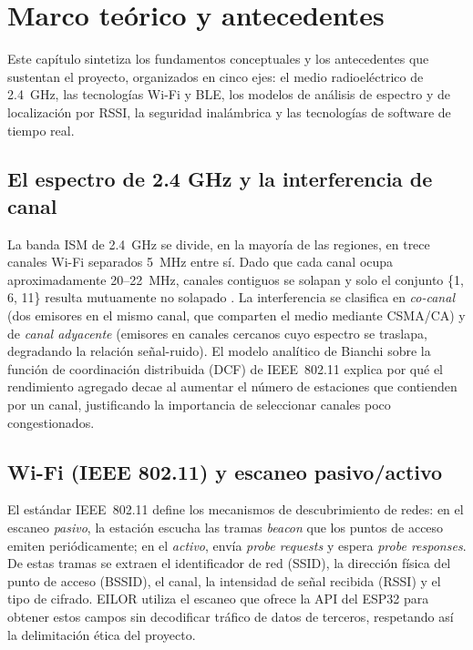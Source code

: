 \chapter{Marco teórico y antecedentes}
\label{cap:marco}

Este capítulo sintetiza los fundamentos conceptuales y los antecedentes que sustentan el proyecto, organizados en cinco ejes: el medio radioeléctrico de 2.4~GHz, las tecnologías Wi\nobreakdash-Fi y BLE, los modelos de análisis de espectro y de localización por RSSI, la seguridad inalámbrica y las tecnologías de software de tiempo real.

\section{El espectro de 2.4 GHz y la interferencia de canal}
La banda ISM de 2.4~GHz se divide, en la mayoría de las regiones, en trece canales Wi\nobreakdash-Fi separados 5~MHz entre sí. Dado que cada canal ocupa aproximadamente 20--22~MHz, canales contiguos se solapan y solo el conjunto \{1, 6, 11\} resulta mutuamente no solapado \parencite{gast2005}. La interferencia se clasifica en \emph{co\nobreakdash-canal} (dos emisores en el mismo canal, que comparten el medio mediante CSMA/CA) y de \emph{canal adyacente} (emisores en canales cercanos cuyo espectro se traslapa, degradando la relación señal\nobreakdash-ruido). El modelo analítico de Bianchi \parencite{bianchi2000} sobre la función de coordinación distribuida (DCF) de IEEE~802.11 explica por qué el rendimiento agregado decae al aumentar el número de estaciones que contienden por un canal, justificando la importancia de seleccionar canales poco congestionados.

\section{Wi-Fi (IEEE 802.11) y escaneo pasivo/activo}
El estándar IEEE~802.11 \parencite{ieee80211} define los mecanismos de descubrimiento de redes: en el escaneo \emph{pasivo}, la estación escucha las tramas \emph{beacon} que los puntos de acceso emiten periódicamente; en el \emph{activo}, envía \emph{probe requests} y espera \emph{probe responses}. De estas tramas se extraen el identificador de red (SSID), la dirección física del punto de acceso (BSSID), el canal, la intensidad de señal recibida (RSSI) y el tipo de cifrado. EILOR utiliza el escaneo que ofrece la API del ESP32 para obtener estos campos sin decodificar tráfico de datos de terceros, respetando así la delimitación ética del proyecto.

